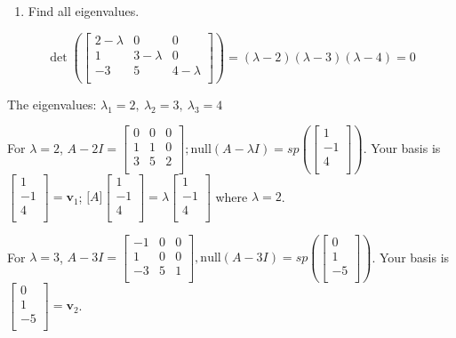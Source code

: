 \documentclass[
]{article}
\begin{document}
\begin{enumerate}
\def\labelenumi{\arabic{enumi}.}
\item
  Find all eigenvalues.
\end{enumerate}

$$\det\left( \begin{bmatrix}
2 - \lambda & 0 & 0 \\
1 & 3 - \lambda & 0 \\
 - 3 & 5 & 4 - \lambda \\
\end{bmatrix} \right) = (\lambda - 2)(\lambda - 3)(\lambda - 4) = 0$$

The eigenvalues: $\lambda_{1} = 2,\ \lambda_{2} = 3,\ \lambda_{3} = 4$

For $\lambda = 2$, $A - 2I = \begin{bmatrix}
0 & 0 & 0 \\
1 & 1 & 0 \\
3 & 5 & 2 \\
\end{bmatrix};\text{null}(A - \lambda I) = sp\left( \begin{bmatrix}
1 \\
 - 1 \\
4 \\
\end{bmatrix} \right)$. Your basis is$\begin{bmatrix}
1 \\
 - 1 \\
4 \\
\end{bmatrix} = {\mathbf{v}}_{1}$;
$\lbrack A\rbrack\begin{bmatrix}
1 \\
 - 1 \\
4 \\
\end{bmatrix} = \lambda\begin{bmatrix}
1 \\
 - 1 \\
4 \\
\end{bmatrix}$ where $\lambda = 2$.

For $\lambda = 3$, $A - 3I = \begin{bmatrix}
 - 1 & 0 & 0 \\
1 & 0 & 0 \\
 - 3 & 5 & 1 \\
\end{bmatrix},\text{null}(A - 3I) = sp\left( \begin{bmatrix}
0 \\
1 \\
 - 5 \\
\end{bmatrix} \right)$. Your basis is $\begin{bmatrix}
0 \\
1 \\
 - 5 \\
\end{bmatrix} = {\mathbf{v}}_{2}$.
\end{document}
